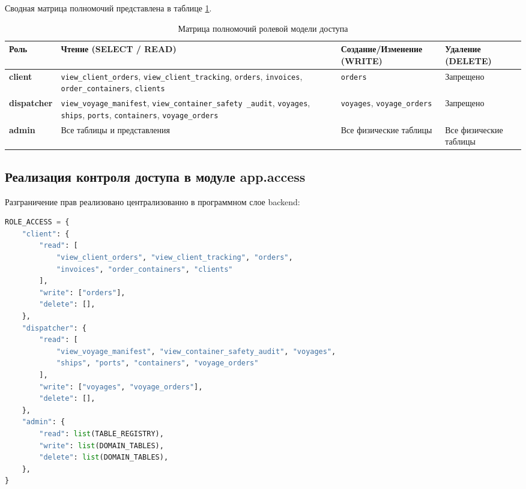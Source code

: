 \documentclass[a4paper,14pt]{article}
\begin{document}
Сводная матрица полномочий представлена в таблице \ref{tab:rbac_matrix}.

\begin{table}[h!]
    \caption{Матрица полномочий ролевой модели доступа}
    \label{tab:rbac_matrix}
    \small
    \begin{tabularx}{\textwidth}{|l|X|X|X|}
        \hline
        \textbf{Роль}       & \textbf{Чтение (SELECT / READ)}                                                                                                                                           & \textbf{Создание/Изменение (WRITE)}       & \textbf{Удаление (DELETE)} \\ \hline
        \textbf{client}     & \texttt{view\_client\_orders}, \texttt{view\_client\_tracking}, \texttt{orders}, \texttt{invoices}, \texttt{order\_containers}, \texttt{clients}                          & \texttt{orders}                           & Запрещено                  \\ \hline
        \textbf{dispatcher} & \texttt{view\_voyage\_manifest}, \texttt{view\_container\_safety \_audit}, \texttt{voyages}, \texttt{ships}, \texttt{ports}, \texttt{containers}, \texttt{voyage\_orders} & \texttt{voyages}, \texttt{voyage\_orders} & Запрещено                  \\ \hline
        \textbf{admin}      & Все таблицы и представления                                                                                                                                               & Все физические таблицы                    & Все физические таблицы     \\ \hline
    \end{tabularx}
    \vspace{1mm}
\end{table}

\subsection{Реализация контроля доступа в модуле app.access}
Разграничение прав реализовано централизованно в программном слое backend:

\begin{lstlisting}[language=Python]
ROLE_ACCESS = {
    "client": {
        "read": [
            "view_client_orders", "view_client_tracking", "orders",
            "invoices", "order_containers", "clients"
        ],
        "write": ["orders"],
        "delete": [],
    },
    "dispatcher": {
        "read": [
            "view_voyage_manifest", "view_container_safety_audit", "voyages",
            "ships", "ports", "containers", "voyage_orders"
        ],
        "write": ["voyages", "voyage_orders"],
        "delete": [],
    },
    "admin": {
        "read": list(TABLE_REGISTRY),
        "write": list(DOMAIN_TABLES),
        "delete": list(DOMAIN_TABLES),
    },
}
\end{lstlisting}
\end{document}

